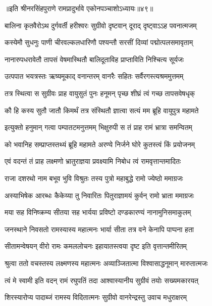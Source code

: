 ॥इति श्रीनरसिंहपुराणे रामप्रादुर्भावे एकोनपञ्चाशोऽध्यायः॥४९॥



\twolineshloka
{बालिना कृतवैरोऽथ दुर्गवर्ती हरीश्वरः}
{सुग्रीवो दृष्टवान् दूराद् दृष्ट्वाऽऽह पवनात्मजम्} %

\twolineshloka
{कस्येमौ सुधनुः पाणी चीरवल्कलधारिणौ}
{पश्यन्तौ सरसीं दिव्यां पद्मोत्पलसमावृताम्} %

\twolineshloka
{नानारुपधरावेतौ तापसं वेषमास्थितौ}
{बालिदूताविह प्राप्ताविति निश्चित्य सूर्यजः} %

\twolineshloka
{उत्पपात भयत्रस्तः ऋष्यमूकाद् वनान्तरम्}
{वानरैः सहितः सर्वैरगस्त्यश्रममुत्तमम्} %

\twolineshloka
{तत्र स्थित्वा स सुग्रीवः प्राह वायुसुतं पुनः}
{हनूमन् पृच्छ शीघ्रं त्वं गच्छ तापसवेषधृक्} %

\twolineshloka
{कौ हि कस्य सुतौ जातौ किमर्थं तत्र संस्थितौ}
{ज्ञात्वा सत्यं मम ब्रूहि वायुपुत्र महामते} %

\twolineshloka
{इत्युक्तो हनुमान् गत्वा पम्पातटमनुत्तमम्}
{भिक्षुरुपी स तं प्राह रामं भ्रात्रा समन्वितम्} %

\twolineshloka
{को भवानिह सम्प्राप्तस्तथ्यं ब्रूहि महामते}
{अरण्ये निर्जने घोरे कुतस्त्वं किं प्रयोजनम्} %

\twolineshloka
{एवं वदन्तं तं प्राह लक्ष्मणो भ्रातुराज्ञया}
{प्रवक्ष्यामि निबोध त्वं रामवृत्तान्तमादितः} %

\twolineshloka
{राजा दशरथो नाम बभूव भुवि विश्रुतः}
{तस्य पुत्रो महाबुद्धे रामो ज्येष्ठो ममाग्रजः} %

\twolineshloka
{अस्याभिषेक आरब्धः कैकेय्या तु निवारितः}
{पितुराज्ञामयं कुर्वन् रामो भ्राता ममाग्रजः} %

\twolineshloka
{मया सह विनिष्क्रम्य सीतया सह भार्यया}
{प्रविष्टो दण्डकारण्यं नानामुनिसमाकुलम्} %

\twolineshloka
{जनस्थाने निवसतो रामस्यास्य महात्मनः}
{भार्या सीता तत्र वने केनापि पाप्पना हता} %

\twolineshloka
{सीतामन्वेषयन् वीरो रामः कमललोचनः}
{इहायातस्त्वया दृष्ट इति वृत्तान्तमीरितम्} %

\twolineshloka
{श्रुत्वा ततो वचस्तस्य लक्ष्मणस्य महात्मनः}
{अव्याञ्जितात्मा विश्वासाद्धनूमान् मारुतात्मजः} %

\twolineshloka
{त्वं मे स्वामी इति वदन् रामं रघुपतिं तदा}
{आश्वास्यानीय सुग्रीवं तयोः सख्यमकारयत्} %

\twolineshloka
{शिरस्यारोप्य पादाब्जं रामस्य विदितात्मनः}
{सुग्रीवो वानरेन्द्रस्तु उवाच मधुराक्षरम्} %

